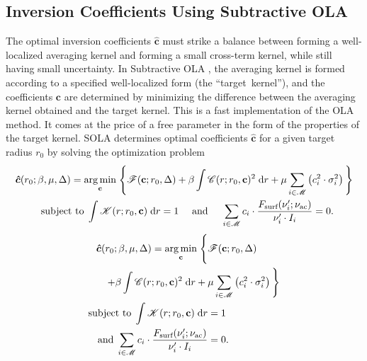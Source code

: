 \subsection{Inversion Coefficients Using Subtractive OLA}
The optimal inversion coefficients $\boldsymbol {\hat c}$ must strike a balance between forming a well-localized averaging kernel and forming a small cross-term kernel, while still having small uncertainty. 
In Subtractive OLA \citep[SOLA,][]{1992A&A...262L..33P, 1994A&A...281..231P}, the averaging kernel is formed according to a specified well-localized form (the ``target~kernel''), and the coefficients $\mathbf c$ are determined by minimizing the difference between the averaging kernel obtained and the target kernel. 
This is a fast implementation of the OLA method. 
It comes at the price of a free parameter in the form of the properties of the target kernel. 
SOLA determines optimal coefficients $\mathbf{\hat{c}}$ for a given target radius $r_0$ by solving the optimization problem 
\begin{align} \label{eq:opt}
        \boldsymbol {\hat c}(r_0; \beta, \mu, \Delta)
        =
        {}&\underset{\mathbf{c}}{\arg\min} \; \Bigg\{
            \mathscr{F}(\mathbf c; r_0, \Delta) 
          + \beta \int \mathscr{C}(r; r_0, \mathbf c)^2 \; \text{d}r 
          + \mu \sum_{i\in\mathscr{M}} \left( c_i^2 \cdot \sigma_i^2 \right)
         \Bigg\} 
         \notag\\\text{subject~to} & \; 
        \int{\mathscr{K}(r; r_0, \mathbf{c})} \; \text{d}r = 1
\quad\text{ and }\quad  \sum_{i\in\mathscr{M}} c_i \cdot \frac{F_{\text{surf}}(\nu'_i; \nu_{\text{ac}})}{\nu'_i \cdot I_i} = 0.
\end{align}
\iffalse
\begin{align} \label{eq:opt}
\boldsymbol {\hat c}(r_0; \beta, \mu, \Delta)
        =
        {}\underset{\mathbf{c}}{\arg\min} \; \Bigg\{
            &\mathscr{F}(\mathbf c; r_0, \Delta) 
    \notag\\+{}\beta \int \mathscr{C}(r; r_0, \mathbf c)^2 \; \text{d}r 
            +{}&{} \mu \sum_{i\in\mathscr{M}} \left( c_i^2 \cdot \sigma_i^2 \right)
         \Bigg\} 
         \notag\\
     \text{subject~to} \; 
        \int \mathscr{K}(r; r_0, \mathbf{c}) \;\text{d}r &= 1
\notag\\\text{and}\; \sum_{i\in\mathscr{M}} c_i \cdot \frac{F_{\text{surf}}(\nu'_{i}; \nu_{\text{ac}})}{\nu'_i \cdot I_{i}} &= 0.
\end{align}
